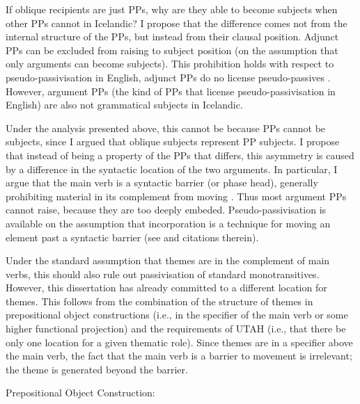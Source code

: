 If oblique recipients are just PPs, why are they able to become subjects when other PPs cannot in Icelandic? I propose that the difference comes not from the internal structure of the PPs, but instead from their clausal position. Adjunct PPs can be excluded from raising to subject position (on the assumption that only arguments can become subjects). This prohibition holds with respect to pseudo-passivisation in English, adjunct PPs do no license pseudo-passives \citep{Hornstein.1981,Baker.1988}. However, argument PPs (the kind of PPs that license pseudo-passivisation in English) are also not grammatical subjects in Icelandic.

Under the analysis presented above, this cannot be because PPs cannot be subjects, since I argued that oblique subjects represent PP subjects. I propose that instead of being a property of the PPs that differs, this asymmetry is caused by a difference in the syntactic location of the two arguments. In particular, I argue that the main verb is a syntactic barrier (or phase head), generally prohibiting material in its complement from moving \citep{Chomsky.2001}. Thus most argument PPs cannot raise, because they are too deeply embeded. Pseudo-passivisation is available on the assumption that incorporation is a technique for moving an element past a syntactic barrier (see \citealt{Alexiadou.2013b} and citations therein). 

Under the standard assumption that themes are in the complement of main verbs, this should also rule out passivisation of standard monotransitives. However, this dissertation has already committed to a different location for themes. This follows from the combination of the structure of themes in prepositional object constructions (i.e., in the specifier of the main verb or some higher functional projection) and the requirements of UTAH (i.e., that there be only one location for a given thematic role). Since themes are in a specifier above the main verb, the fact that the main verb is a barrier to movement is irrelevant; the theme is generated beyond the barrier.

\begin{exe}
	 Prepositional Object Construction: \\
\end{exe}


